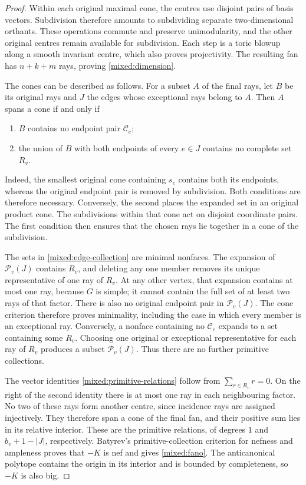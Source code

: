 \begin{proof}
Within each original maximal cone, the centres use disjoint pairs of
basis vectors. Subdivision therefore amounts to subdividing separate
two-dimensional orthants. These operations commute and preserve
unimodularity, and the other original centres remain available for
subdivision. Each step is a toric blowup along a smooth invariant centre,
which also proves projectivity. The resulting fan has $n+k+m$ rays,
proving
\eqref{mixed:dimension}.

The cones can be described as follows. For a subset $A$ of the final
rays, let $B$ be its original rays and $J$ the edges whose exceptional
rays belong to $A$. Then $A$ spans a cone if and only if
\begin{enumerate}
\item $B$ contains no endpoint pair $\mathcal C_e$;
\item the union of $B$ with both endpoints of every $e\in J$ contains
      no complete set $R_v$.
\end{enumerate}
Indeed, the smallest original cone containing $s_e$ contains both its
endpoints, whereas the original endpoint pair is removed by subdivision.
Both conditions are therefore necessary. Conversely, the second places
the expanded set in an original product cone. The subdivisions within
that cone act on disjoint coordinate pairs. The first condition then
ensures that the chosen rays lie together in a cone of the subdivision.

The sets in \eqref{mixed:edge-collection} are minimal nonfaces. The
expansion of $\mathcal P_v(J)$ contains $R_v$, and deleting any one member
removes its unique representative of one ray of $R_v$. At any other
vertex, that expansion contains at most one ray, because $G$ is simple;
it cannot contain the full set of at least two rays of that factor.
There is also no original endpoint pair in $\mathcal P_v(J)$. The cone criterion therefore proves minimality, including the case in
which every member is an exceptional ray. Conversely, a nonface containing no $\mathcal C_e$
expands to a set containing some $R_v$. Choosing one original or
exceptional representative for each ray of $R_v$ produces a subset
$\mathcal P_v(J)$. Thus there are no further primitive collections.

The vector identities \eqref{mixed:primitive-relations} follow from
$\sum_{r\in R_v}r=0$. On the right of the second identity there is at
most one ray in each neighbouring factor. No two of these rays form
another centre, since incidence rays are assigned injectively. They
therefore span a cone of the final fan, and their positive sum lies in
its relative interior. These are the primitive relations, of degrees
$1$ and $b_v+1-|J|$, respectively. Batyrev's primitive-collection
criterion for nefness and ampleness
\cite[Theorem~6.4.9]{CoxLittleSchenck2011} proves that $-K$ is nef and
gives \eqref{mixed:fano}. The anticanonical polytope contains the origin
in its interior and is bounded by completeness, so $-K$ is also big.


\end{proof}
